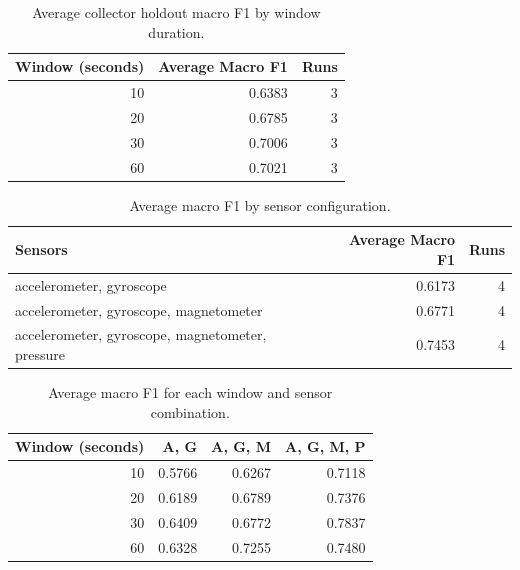 \begin{table}[htbp]
\centering
\caption{Average collector holdout macro F1 by window duration.}
\label{tab:transfer-v2-window-f1}
\begin{tabular}{rrr}
\hline
\textbf{Window (seconds)} & \textbf{Average Macro F1} & \textbf{Runs} \\
\hline
10 & 0.6383 & 3 \\
20 & 0.6785 & 3 \\
30 & 0.7006 & 3 \\
60 & 0.7021 & 3 \\
\hline
\end{tabular}
\end{table}

\begin{table}[htbp]
\centering
\caption{Average macro F1 by sensor configuration.}
\label{tab:transfer-v2-sensor-f1}
\begin{tabular}{lrr}
\hline
\textbf{Sensors} & \textbf{Average Macro F1} & \textbf{Runs} \\
\hline
accelerometer, gyroscope & 0.6173 & 4 \\
accelerometer, gyroscope, magnetometer & 0.6771 & 4 \\
accelerometer, gyroscope, magnetometer, pressure & 0.7453 & 4 \\
\hline
\end{tabular}
\end{table}

\begin{table}[htbp]
\centering
\caption{Average macro F1 for each window and sensor combination.}
\label{tab:transfer-v2-run-f1}
\begin{tabular}{rrrr}
\hline
\textbf{Window (seconds)} & \textbf{A, G} & \textbf{A, G, M} & \textbf{A, G, M, P} \\
\hline
10 & 0.5766 & 0.6267 & 0.7118 \\
20 & 0.6189 & 0.6789 & 0.7376 \\
30 & 0.6409 & 0.6772 & 0.7837 \\
60 & 0.6328 & 0.7255 & 0.7480 \\
\hline
\end{tabular}
\end{table}

